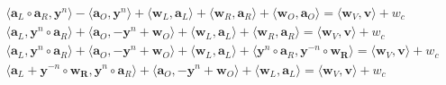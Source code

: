 \documentclass[../../book.tex]{subfiles}
\begin{document}
\small
\begin{equation*}
    \begin{aligned}
        \langle \mathbf{a}_L \circ \mathbf{a}_R, \mathbf{y}^n \rangle - \langle \mathbf{a}_O, \mathbf{y}^n \rangle + \langle \mathbf{w}_L, \mathbf{a}_L \rangle + \langle \mathbf{w}_R, \mathbf{a}_R \rangle + \langle \mathbf{w}_O, \mathbf{a}_O \rangle = \langle \mathbf{w}_V, \mathbf{v} \rangle + w_c \\
        \langle \mathbf{a}_L, \mathbf{y}^n \circ \mathbf{a}_R \rangle + \langle \mathbf{a}_O, - \mathbf{y}^n + \mathbf{w}_O \rangle + \langle \mathbf{w}_L, \mathbf{a}_L \rangle + \langle \mathbf{w}_R, \mathbf{a}_R \rangle = \langle \mathbf{w}_V, \mathbf{v} \rangle + w_c \\
        \langle \mathbf{a}_L, \mathbf{y}^n \circ \mathbf{a}_R \rangle + \langle \mathbf{a}_O, - \mathbf{y}^n + \mathbf{w}_O \rangle + \langle \mathbf{w}_L, \mathbf{a}_L \rangle + \langle \mathbf{y}^n \circ \mathbf{a}_R, \mathbf{y}^{-n} \circ \mathbf{w_R} \rangle = \langle \mathbf{w}_V, \mathbf{v} \rangle + w_c \\
        \langle \mathbf{a}_L + \mathbf{y}^{-n} \circ \mathbf{w_R}, \mathbf{y}^n \circ \mathbf{a}_R \rangle + \langle \mathbf{a}_O, - \mathbf{y}^n + \mathbf{w}_O \rangle + \langle \mathbf{w}_L, \mathbf{a}_L \rangle = \langle \mathbf{w}_V, \mathbf{v} \rangle + w_c \\
    \end{aligned}
\end{equation*}
\normalsize
\end{document}
